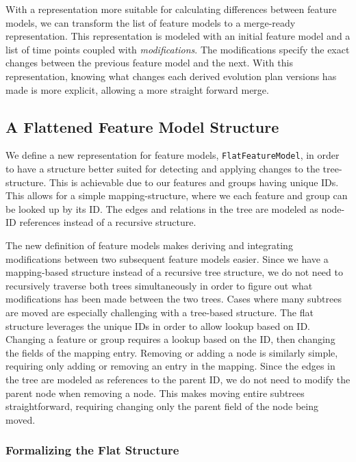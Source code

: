 \documentclass[a4paper,english]{ifimaster}
\begin{document}
With a representation more suitable for calculating differences between feature models, we can transform the list of feature models to a merge-ready representation. This representation is modeled with an initial feature model and a list of time points coupled with \textit{modifications}. The modifications specify the exact changes between the previous feature model and the next. With this representation, knowing what changes each derived evolution plan versions has made is more explicit, allowing a more straight forward merge.

\subsection{A Flattened Feature Model Structure}%
\label{sub:a_flatter_feature_model_structure}

We define a new representation for feature models, \texttt{FlatFeatureModel}, in order to have a structure better suited for detecting and applying changes to the tree-structure. This is achievable due to our features and groups having unique IDs. This allows for a simple mapping-structure, where we each feature and group can be looked up by its ID. The edges and relations in the tree are modeled as node-ID references instead of a recursive structure.

The new definition of feature models makes deriving and integrating modifications between two subsequent feature models easier. Since we have a mapping-based structure instead of a recursive tree structure, we do not need to recursively traverse both trees simultaneously in order to figure out what modifications has been made between the two trees. Cases where many subtrees are moved are especially challenging with a tree-based structure. The flat structure leverages the unique IDs in order to allow lookup based on ID. Changing a feature or group requires a lookup based on the ID, then changing the fields of the mapping entry. Removing or adding a node is similarly simple, requiring only adding or removing an entry in the mapping. Since the edges in the tree are modeled as references to the parent ID, we do not need to modify the parent node when removing a node. This makes moving entire subtrees straightforward, requiring changing only the parent field of the node being moved.

\subsubsection{Formalizing the Flat Structure}%
\label{ssub:formalizing_the_flat_structure}
\end{document}

